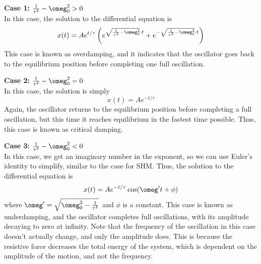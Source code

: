 \noindent \textbf{Case 1:} $\frac{1}{\tau^2} - \omeg_0^2 > 0$ \\
\noindent In this case, the solution to the differential equation is 
\begin{equation}
    x(t) = Ae^{t/\tau}\left( e^{\sqrt{\frac{1}{\tau^2} - \omeg_0^2}\cdot t} + e^{-\sqrt{\frac{1}{\tau^2} - \omeg_0^2}\cdot t} \right)
\end{equation}
\noindent This case is known as overdamping, and it indicates that the oscillator goes back to the equilibrium position before completing one full oscillation. 

\noindent \textbf{Case 2:} $\frac{1}{\tau^2} - \omeg_0^2 = 0$ \\
\noindent In this case, the solution is simply
\begin{equation}
    x(t) = Ae^{-t/\tau}
\end{equation}
\noindent Again, the oscillator returns to the equilibrium position before completing a full oscillation, but this time it reaches equilibrium in the fastest time possible. Thus, this case is known as critical damping.

\noindent \textbf{Case 3:} $\frac{1}{\tau^2} - \omeg_0^2 < 0$ \\
\noindent In this case, we get an imaginary number in the exponent, so we can use Euler's identity to simplify, similar to the case for SHM. Thus, the solution to the differential equation is 
\begin{equation}
    x(t) = Ae^{-t/\tau}\cos(\omeg' t + \phi)
\end{equation}
\noindent where $\omeg' = \sqrt{\omeg_0^2 - \frac{1}{\tau^2}}$ and $\phi$ is a constant. This case is known as underdamping, and the oscillator completes full oscillations, with its amplitude decaying to zero at infinity. Note that the frequency of the oscillation in this case doesn't actually change, and only the amplitude does. This is because the resistive force decreases the total energy of the system, which is dependent on the amplitude of the motion, and not the frequency.

%
%
